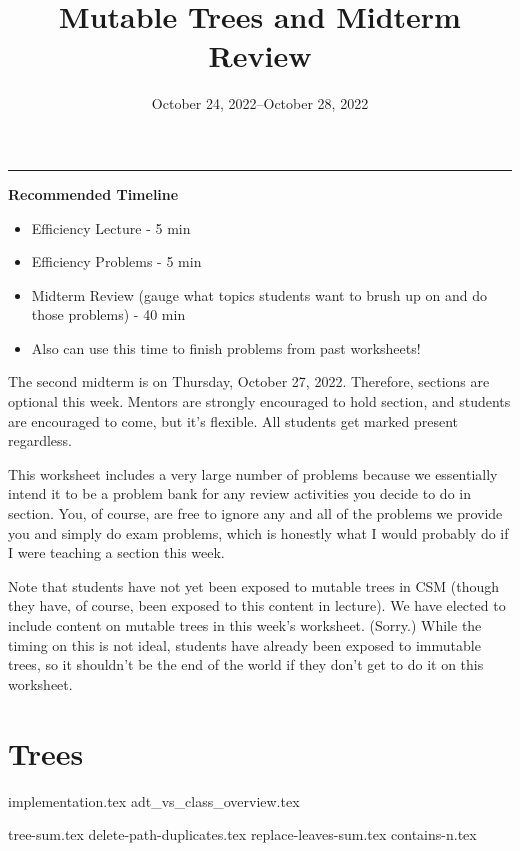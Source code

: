 \documentclass{exam}
\title{Mutable Trees and Midterm Review}
\date{October 24, 2022--October 28, 2022}
\begin{document}
\maketitle
\rule{\textwidth}{0.15em}
\fontsize{12}{15}\selectfont

\begin{meta}
    \textbf{Recommended Timeline}
    \begin{itemize}
        \item Efficiency Lecture - 5 min
        \item Efficiency Problems - 5 min
        \item Midterm Review (gauge what topics students want to brush up on and do those problems) - 40 min
        \item Also can use this time to finish problems from past worksheets!
    \end{itemize}

    The second midterm is on Thursday, October 27, 2022. Therefore, sections are optional this week. Mentors are strongly encouraged to hold section, and students are encouraged to come, but it's flexible. All students get marked present regardless. 
    
    This worksheet includes a very large number of problems because we essentially intend it to be a problem bank for any review activities you decide to do in section. You, of course, are free to ignore any and all of the problems we provide you and simply do exam problems, which is honestly what I would probably do if I were teaching a section this week. 

    Note that students have not yet been exposed to mutable trees in CSM (though they have, of course, been exposed to this content in lecture). We have elected to include content on mutable trees in this week's worksheet. (Sorry.) While the timing on this is not ideal, students have already been exposed to immutable trees, so it shouldn't be the end of the world if they don't get to do it on this worksheet. 
\end{meta}

\section{Trees}
{implementation.tex}
{adt_vs_class_overview.tex}
\begin{questions}
    {tree-sum.tex}
    \newpage
    {delete-path-duplicates.tex}
    \newpage
    {replace-leaves-sum.tex}
    {contains-n.tex}
\end{questions}
\end{document}
